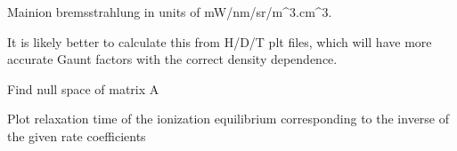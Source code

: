 \documentclass[letterpaper,10pt,english]{sphinxmanual}
\begin{document}

\begin{fulllineitems}
\label{\detokenize{aurora:aurora.atomic.main_ion_brems}}
Main\sphinxhyphen{}ion bremsstrahlung in units of  mW/nm/sr/m\textasciicircum{}3.cm\textasciicircum{}3.

It is likely better to calculate this from H/D/T plt files, which will have more accurate 
Gaunt factors with the correct density dependence.

\end{fulllineitems}


\begin{fulllineitems}
\label{\detokenize{aurora:aurora.atomic.null_space}}
Find null space of matrix A

\end{fulllineitems}


\begin{fulllineitems}
\label{\detokenize{aurora:aurora.atomic.plot_relax_time}}
Plot relaxation time of the ionization equilibrium corresponding
to the inverse of the given rate coefficients

\end{fulllineitems}

\end{document}
